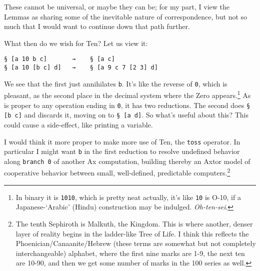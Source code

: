 \documentclass[twoside]{article}
\begin{document}
These cannot be universal, or maybe they can be; for my part, I view the Lemmas as sharing some of the inevitable nature of correspondence, but not so much that I would want to continue down that path further. %

What then do we wish for Ten? Let us view it:

\begin{lstlisting}[style=listingcode]
§ [a 10 b c]       →    § [a c]
§ [a 10 [b c] d]   →    § [a 9 c 7 [2 3] d]
\end{lstlisting}

\noindent
We see that the first just annihilates \texttt{b}. It's like the reverse of \texttt{0}, which is pleasant, as the second place in the decimal system where the Zero appears.\footnote{In binary it is \texttt{1010}, which is pretty neat actually, it's like \texttt{10} is O-10, if a Japanese-`Arabic' (Hindu) construction may be indulged. \emph{Oh-ten-sei}.}  As is proper to any operation ending in \texttt{0}, it has two reductions. The second does \texttt{§ [b c]} and discards it, moving on to \texttt{§ [a d]}. So what's useful about this? This could cause a side-effect, like printing a variable.

\sloppy
I would think it more proper to make more use of Ten, the \texttt{toss} operator. In particular I might want \texttt{b} in the first reduction to resolve undefined behavior along \texttt{branch 0} of another Ax computation, building thereby an Axtor model of cooperative behavior between small, well-defined, predictable \mbox{computers}.\footnote{The tenth Sephiroth is Malkuth, the Kingdom. This is where another, denser layer of reality begins in the ladder-like Tree of Life. I think this reflects the Phoenician/Canaanite/Hebrew (these terms are somewhat but not completely interchangeable) alphabet, where the first nine marks are 1-9, the next ten are 10-90, and then we get some number of marks in the 100 series as well.}



\end{document}
